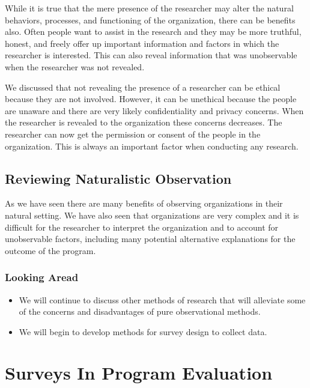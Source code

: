 \documentclass[]{book}
\theoremstyle{definition}
\theoremstyle{definition}
\theoremstyle{definition}
\theoremstyle{remark}
\begin{document}
While it is true that the mere presence of the researcher may alter the
natural behaviors, processes, and functioning of the organization, there
can be benefits also. Often people want to assist in the research and
they may be more truthful, honest, and freely offer up important
information and factors in which the researcher is interested. This can
also reveal information that was unobservable when the researcher was
not revealed.

We discussed that not revealing the presence of a researcher can be
ethical because they are not involved. However, it can be unethical
because the people are unaware and there are very likely confidentiality
and privacy concerns. When the researcher is revealed to the
organization these concerns decreases. The researcher can now get the
permission or consent of the people in the organization. This is always
an important factor when conducting any research.

\hypertarget{reviewing-naturalistic-observation}{%
\section{Reviewing Naturalistic
Observation}\label{reviewing-naturalistic-observation}}

As we have seen there are many benefits of observing organizations in
their natural setting. We have also seen that organizations are very
complex and it is difficult for the researcher to interpret the
organization and to account for unobservable factors, including many
potential alternative explanations for the outcome of the program.

\hypertarget{looking-aread}{%
\subsection{Looking Aread}\label{looking-aread}}

\begin{itemize}
\item
  We will continue to discuss other methods of research that will
  alleviate some of the concerns and disadvantages of pure observational
  methods.
\item
  We will begin to develop methods for survey design to collect data.
\end{itemize}

\hypertarget{surveys-in-program-evaluation}{%
\chapter{Surveys In Program
Evaluation}\label{surveys-in-program-evaluation}}
\end{document}
